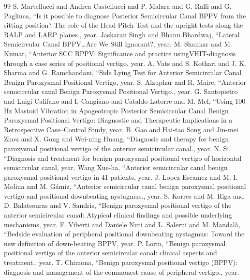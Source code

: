 \documentclass[11pt]{article}
\begin{document}
\begin{thebibliography}{99}
 S. Martellucci and Andrea Castellucci and P. Malara and G. Ralli and G. Pagliuca, ``Is it possible to diagnose Posterior Semicircular Canal BPPV from the sitting position? The role of the Head Pitch Test and the upright tests along the RALP and LARP planes., {year}.
 Jaskaran Singh and Bhanu Bhardwaj, ``Lateral Semicircular Canal BPPV…Are We Still Ignorant?, {year}.
 M. Shankar and M. Kumar, ``Anterior SCC BPPV: Significance and practice usingVHIT-diagnosis through a case series of positional vertigo, {year}.
 A. Vats and S. Kothari and J. K. Sharma and G. Ramchandani, ``Side Lying Test for Anterior Semicircular Canal Benign Paroxysmal Positional Vertigo, {year}.
 S. Alzuphar and R. Maire, ``Anterior semicircular canal Benign Paroxysmal Positional Vertigo., {year}.
 G. Santopietro and Luigi Califano and I. Cangiano and Cataldo Latorre and M. Mel, ``Using 100 Hz Mastoid Vibration in Apogeotropic Posterior Semicircular Canal Benign Paroxysmal Positional Vertigo: Diagnostic and Therapeutic Implications in a Retrospective Case–Control Study, {year}.
 B. Gao and Hai-tao Song and Jin-mei Zhou and X. Gong and Wei-ning Huang, ``Diagnosis and therapy for benign paroxysmal positional vertigo of the anterior semicircular canal., {year}.
 N. Si, ``Diagnosis and treatment for benign paroxysmal positional vertigo of horizontal semicircular canal, {year}.
 Wang Xue-ha, ``Anterior semicircular canal benign paroxysmal positional vertigo in 41 patients, {year}.
 J. Lopez-Escamez and M. I. Molina and M. Gámiz, ``Anterior semicircular canal benign paroxysmal positional vertigo and positional downbeating nystagmus., {year}.
 S. Korres and M. Riga and D. Balatsouras and V. Sandris, ``Benign paroxysmal positional vertigo of the anterior semicircular canal: Atypical clinical findings and possible underlying mechanisms, {year}.
 F. Viberti and Daniele Nuti and L. Salerni and M. Mandalà, ``Bedside evaluation of peripheral positional downbeating nystagmus: Toward the new definition of down-beating BPPV, {year}.
 P. Lorin, ``Benign paroxysmal positional vertigo of the anterior semicircular canal: clinical aspects and treatment., {year}.
 T. Chimona, ``Benign paroxysmal positional vertigo (BPPV): diagnosis and management of the commonest cause of peripheral vertigo., {year}.

\end{thebibliography}
\end{document}

